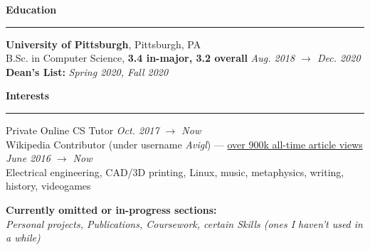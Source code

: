 \documentclass[10pt]{article}
\begin{document}
\begin{flushleft}
		\vspace{1.5mm}
		{\large \raggedright \textbf{Education}}
		\vspace{1.25mm}
	
		\hrule
		
		\vspace{2.25mm}
		\textbf{University of Pittsburgh}, Pittsburgh, PA\\
      	{\small B.Sc. in Computer Science, \textbf{3.4 in-major, 3.2 overall} \hfill \textit{Aug. 2018 $\rightarrow$ Dec. 2020}}\\
		{\small \textbf{Dean's List:} \textit{Spring 2020, Fall 2020}}\\

		\vspace{1.25mm}
		{\large \raggedright \textbf{Interests}}
		\vspace{1.25mm}
	
		\hrule
	
		\vspace{2.25mm}
		Private Online CS Tutor \hfill \textit{\small Oct. 2017 $\rightarrow$ Now}\\
		Wikipedia Contributor (under username \textit{Avigl}) --- \href{https://pageviews.toolforge.org/?project=en.wikipedia.org&platform=all-access&agent=user&redirects=0&range=all-time&pages=Timeline_of_social_media|Timeline_of_online_advertising|Timeline_of_e-commerce|Screening_Partnership_Program|Silicon_Valley_Education_Foundation|Chicago_Community_Trust}{over 900k all-time article views} \hfill \textit{\small June 2016 $\rightarrow$ Now}\\
		Electrical engineering, CAD/3D printing, Linux, music, metaphysics, writing, history, videogames

		\vspace*{\fill}
		\textbf{Currently omitted or in-progress sections:}\\ 
		\textit{Personal projects, Publications, Coursework, certain Skills (ones I haven't used in a while)} 
	\end{flushleft}
\end{document}
